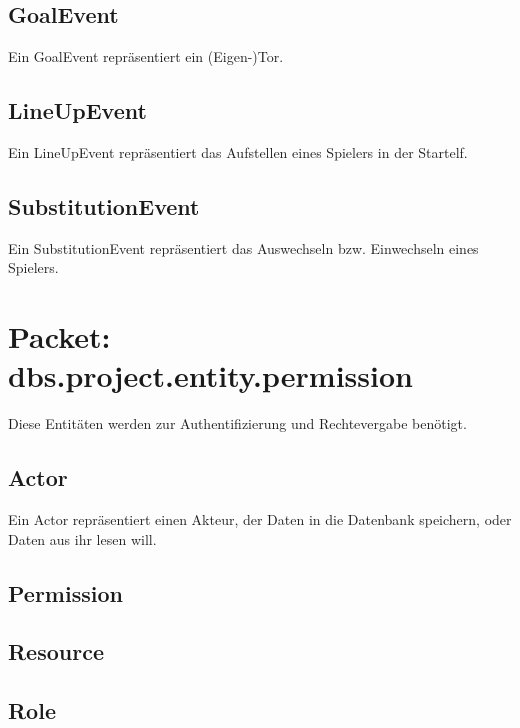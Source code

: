 \documentclass[11pt,german]{scrartcl}
\begin{document}
\subsection{GoalEvent}
Ein GoalEvent repräsentiert ein (Eigen-)Tor.

\subsection{LineUpEvent}
Ein LineUpEvent repräsentiert das Aufstellen eines Spielers in der Startelf.

\subsection{SubstitutionEvent}
Ein SubstitutionEvent repräsentiert das Auswechseln bzw. Einwechseln eines Spielers.

\section{Packet: dbs.project.entity.permission}
Diese Entitäten werden zur Authentifizierung und Rechtevergabe benötigt.

\subsection{Actor}
Ein Actor repräsentiert einen Akteur, der Daten in die Datenbank speichern, oder Daten aus ihr lesen will.

\subsection{Permission}

\subsection{Resource}


\subsection{Role}
%
\end{document}

